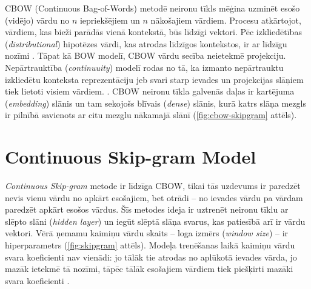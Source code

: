 CBOW (Continuous Bag-of-Words) metodē neironu tīkls mēģina uzminēt esošo (vidējo) vārdu no $n$ iepriekšējiem un $n$ nākošajiem vārdiem. Procesu atkārtojot, vārdiem, kas bieži parādās vienā kontekstā, būs līdzīgi vektori. Pēc izkliedētības (\textit{distributional}) hipotēzes vārdi, kas atrodas līdzīgos kontekstos, ir ar līdzīgu nozīmi \cite{word2vec2013}. Tāpat kā BOW modelī, CBOW vārdu secība neietekmē projekciju. Nepārtrauktība (\textit{continuuity}) modelī rodas no tā, ka izmanto nepārtrauktu izkliedētu konteksta reprezentāciju
jeb svari starp ievades un projekcijas slāņiem tiek lietoti visiem vārdiem.
\cite{word2vec2013}.
CBOW neironu tīkla galvenās daļas ir kartējuma (\textit{embedding}) slānis un tam sekojošs blīvais (\textit{dense}) slānis, kurā katrs slāņa mezgls ir pilnībā savienots ar citu mezglu nākamajā slānī (\ref{fig:cbow-skipgram} attēls).



\section{Continuous Skip-gram Model}


\textit{Continuous Skip-gram} metode ir līdzīga CBOW, tikai tās uzdevums ir paredzēt nevis vienu vārdu no apkārt esošajiem, bet otrādi -- no ievades vārdu pa vārdam paredzēt apkārt esošos vārdus.
Šīs metodes ideja ir uztrenēt neironu tīklu ar slēpto slāni (\textit{hidden layer}) un iegūt slēptā slāņa svarus, kas patiesībā arī ir vārdu vektori. Vērā ņemamu kaimiņu vārdu skaits -- loga izmērs (\textit{window size}) -- ir hiperparametrs (\ref{fig:skipgram} attēls). Modeļa trenēšanas laikā kaimiņu vārdu svara koeficienti nav vienādi: jo tālāk tie atrodas no aplūkotā ievades vārda, jo mazāk ietekmē tā nozīmi, tāpēc tālāk esošajiem vārdiem tiek piešķirti mazāki svara koeficienti \cite{word2vec2013}. 


